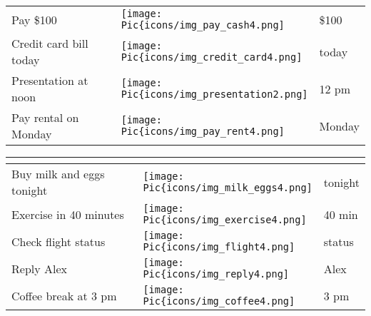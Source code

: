 \begin{table}[hptb]
\begin{tabular}{@{}p{5.5cm}p{1cm}p{1.8cm}@{}}
    Pay \$100                 &   \texttt{[image: \\Pic\{icons/img\_pay\_cash4.png]}}       & \hspace{1mm} \$100          \\  

    Credit card bill today                 &   \texttt{[image: \\Pic\{icons/img\_credit\_card4.png]}}       & \hspace{1mm} today          \\  

    Presentation at noon                 &   \texttt{[image: \\Pic\{icons/img\_presentation2.png]}}       & \hspace{1mm} 12 pm          \\  

    Pay rental on Monday                 &   \texttt{[image: \\Pic\{icons/img\_pay\_rent4.png]}}       & \hspace{1mm} Monday          \\  
    \bottomrule
    \end{tabular}\quad %
    \begin{tabular}{@{}p{5.5cm}p{1cm}p{1.8cm}@{}}
    \toprule
    \textformat{}                            & \multicolumn{2}{l}{\iconformat{}} \\ \midrule
    
     Buy milk and eggs tonight                 &   \texttt{[image: \\Pic\{icons/img\_milk\_eggs4.png]}}       & \hspace{1mm} tonight          \\  

    Exercise in 40 minutes                 &   \texttt{[image: \\Pic\{icons/img\_exercise4.png]}}       & \hspace{1mm} 40 min          \\  

    Check flight status                 &   \texttt{[image: \\Pic\{icons/img\_flight4.png]}}       & \hspace{1mm} status          \\  

    Reply Alex                 &   \texttt{[image: \\Pic\{icons/img\_reply4.png]}}       & \hspace{1mm} Alex          \\  

    Coffee break at 3 pm                &   \texttt{[image: \\Pic\{icons/img\_coffee4.png]}}       & \hspace{1mm} 3 pm          \\  
    

\end{tabular}
\end{table}
